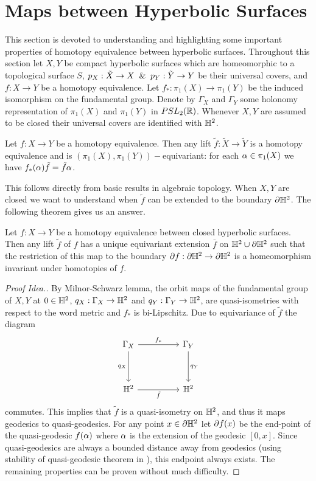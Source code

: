 \section{Maps between Hyperbolic Surfaces}
This section is devoted to understanding and highlighting some important properties of homotopy equivalence between hyperbolic surfaces. Throughout this section let $X,Y$ be compact hyperbolic surfaces which are homeomorphic to a topological surface $S$, $p_X:\tilde{X}\to X \And p_Y:\tilde{Y}\to Y$ be their universal covers, and $f:X\to Y$ be a homotopy equivalence. Let $f_{*}:\pi_1(X)\to \pi_1(Y)$ be the induced isomorphism on the fundamental group. Denote by $\Gamma_X$ and $\Gamma_Y$ some holonomy representation of $\pi_1(X)$ and $\pi_1(Y)$ in $PSL_2(\mathbb{R})$. Whenever $X,Y$ are assumed to be closed their universal covers are identified with $\mathbb{H}^2$.
\begin{proposition}
  Let $f:X\to Y$ be a homotopy equivalence. Then any lift $\tilde{f}:\tilde{X}\to \tilde{Y}$ is a homotopy equivalence and is $(\pi_1(X),\pi_1(Y))-$equivariant: for each $\alpha\in \pi_1(X)$ we have $f_{*}(\alpha)\tilde{f} = \tilde{f}\alpha$.
\end{proposition}
This follows directly from basic results in algebraic topology. When $X,Y$ are closed we want to understand when $\tilde{f}$ can be extended to the boundary ${\partial \mathbb{H}^2}$. The following theorem gives us an answer.
\begin{theorem}\label{thm:boundary_maps}
  Let $f:X\to Y$ be a homotopy equivalence between closed hyperbolic surfaces. Then any lift $\tilde{f}$ of $f$ has a unique equivariant extension $\bar{f}$ on $\mathbb{H}^2\cup {\partial \mathbb{H}^2}$ such that the restriction of this map to the boundary $\partial f:{\partial \mathbb{H}^2}\to {\partial \mathbb{H}^2}$ is a homeomorphism invariant under homotopies of $f$.
\end{theorem}
\begin{proof}[Proof Idea.]
  By Milnor-Schwarz lemma, the orbit maps of the fundamental group of $X,Y$ at $0\in \mathbb{H}^2$,   $q_X:\Gamma_X\to \mathbb{H}^2$ and $q_Y:\Gamma_Y\to \mathbb{H}^2$, are quasi-isometries with respect to the word metric and $f_*$ is bi-Lipschitz. Due to equivariance of $\tilde{f}$ the diagram
  \[\begin{tikzcd}
	{\Gamma_X} && {\Gamma_Y} \\
	\\
	{\mathbb{H}^2} && {\mathbb{H}^2}
	\arrow["{f_*}", from=1-1, to=1-3]
	\arrow["{q_X}"', from=1-1, to=3-1]
	\arrow["{q_Y}", from=1-3, to=3-3]
	\arrow["{\tilde{f}}"', from=3-1, to=3-3]
\end{tikzcd}\]
commutes. This implies that $\tilde{f}$ is a quasi-isometry on $\mathbb{H}^2$, and thus it maps geodesics to quasi-geodesics. For any point $x\in {\partial \mathbb{H}^2}$ let $\partial {f}(x)$ be the end-point of the quasi-geodesic $f(\alpha)$ where $\alpha$ is the extension of the geodesic $[0,x]$. Since quasi-geodesics are always a bounded distance away from geodesics (using stability of quasi-geodesic theorem in \cite{metric}), this endpoint always exists. The remaining properties can be proven without much difficulty.
\end{proof}
